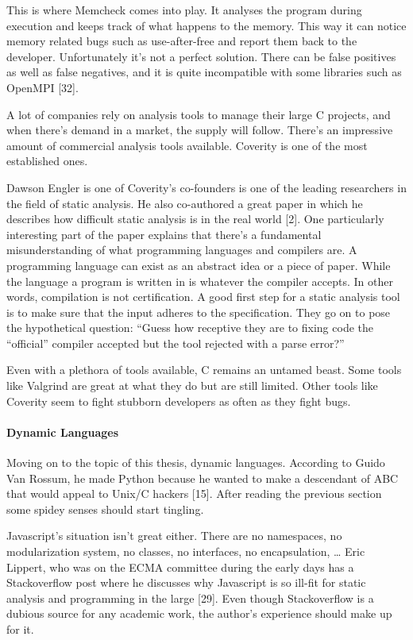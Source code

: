 \documentclass[]{article}
\let\oldparagraph\paragraph
\renewcommand{\paragraph}[1]{\oldparagraph{#1}\mbox{}}
\begin{document}
This is where Memcheck comes into play. It analyses the program during
execution and keeps track of what happens to the memory. This way it can
notice memory related bugs such as use-after-free and report them back
to the developer. Unfortunately it's not a perfect solution. There can
be false positives as well as false negatives, and it is quite
incompatible with some libraries such as OpenMPI {[}32{]}.

A lot of companies rely on analysis tools to manage their large C
projects, and when there's demand in a market, the supply will follow.
There's an impressive amount of commercial analysis tools available.
Coverity is one of the most established ones.

Dawson Engler is one of Coverity's co-founders is one of the leading
researchers in the field of static analysis. He also co-authored a great
paper in which he describes how difficult static analysis is in the real
world {[}2{]}. One particularly interesting part of the paper explains
that there's a fundamental misunderstanding of what programming
languages and compilers are. A programming language can exist as an
abstract idea or a piece of paper. While the language a program is
written in is whatever the compiler accepts. In other words, compilation
is not certification. A good first step for a static analysis tool is to
make sure that the input adheres to the specification. They go on to
pose the hypothetical question: ``Guess how receptive they are to fixing
code the ``official'' compiler accepted but the tool rejected with a
parse error?''

Even with a plethora of tools available, C remains an untamed beast.
Some tools like Valgrind are great at what they do but are still
limited. Other tools like Coverity seem to fight stubborn developers as
often as they fight bugs.

\paragraph{Dynamic Languages}\label{dynamic-languages}

Moving on to the topic of this thesis, dynamic languages. According to
Guido Van Rossum, he made Python because he wanted to make a descendant
of ABC that would appeal to Unix/C hackers {[}15{]}. After reading the
previous section some spidey senses should start tingling.

Javascript's situation isn't great either. There are no namespaces, no
modularization system, no classes, no interfaces, no encapsulation,
\ldots{} Eric Lippert, who was on the ECMA committee during the early
days has a Stackoverflow post where he discusses why Javascript is so
ill-fit for static analysis and programming in the large {[}29{]}. Even
though Stackoverflow is a dubious source for any academic work, the
author's experience should make up for it.
\end{document}
